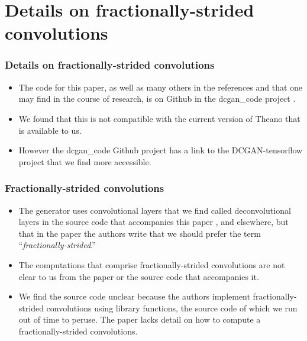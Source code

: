 \documentclass{beamer}
\begin{document}
\section{Details on fractionally-strided convolutions}
\begin{frame}
\frametitle{Details on fractionally-strided convolutions}
\begin{itemize}
\item The code for this paper, as well as many others in the references and
that one may find in the course of research, is on Github in the dcgan\_code
project \cite{dcganCode}.

\item We found that this is not compatible with the current version of Theano that
  is available to us.  
\item However the dcgan\_code Github project has a link
to the DCGAN-tensorflow \cite{dcganTf} project that we find more accessible.
\end{itemize}
\end{frame}



\begin{frame}
\frametitle{Fractionally-strided convolutions}
\begin{itemize}

\item The generator uses convolutional layers that we find called
deconvolutional layers in the source code that accompanies this paper
\cite{dcganCode}, and elsewhere, but that in the paper the authors write that
we should prefer the term ``\textit{fractionally-strided}.''  

\item The computations that comprise fractionally-strided convolutions are not
clear to us from the paper or the source code that accompanies it.  

\item We find the source code unclear because the authors implement
  fractionally-strided convolutions using library functions, the source code of
  which we run out of time to peruse.  The paper lacks detail on how to compute a
  fractionally-strided convolutions.
\end{itemize}
\end{frame}

\end{document}
